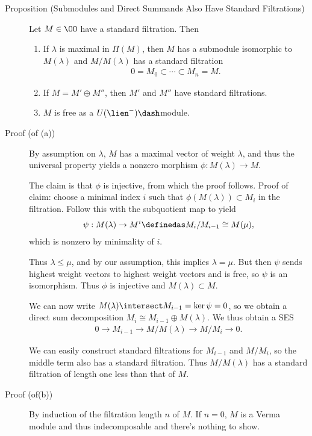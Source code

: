 \begin{description}
\item[Proposition (Submodules and Direct Summands Also Have Standard
Filtrations)]
Let \(M\in \OO\) have a standard filtration. Then

\begin{enumerate}
\def\labelenumi{\alph{enumi}.}
\tightlist
\item
  If \(\lambda\) is maximal in \(\Pi(M)\), then \(M\) has a submodule
  isomorphic to \(M(\lambda)\) and \(M/M(\lambda)\) has a standard
  filtration
  \begin{align*}0 = M_0 \subset \cdots \subset M_n = M.\end{align*}
\item
  If \(M = M' \oplus M''\), then \(M'\) and \(M''\) have standard
  filtrations.
\item
  \(M\) is free as a \(U(\lien^-)\dash\)module.
\end{enumerate}
\item[Proof (of (a))]
By assumption on \(\lambda\), \(M\) has a maximal vector of weight
\(\lambda\), and thus the universal property yields a nonzero morphism
\(\phi: M(\lambda) \to M\).

The claim is that \(\phi\) is injective, from which the proof follows.
Proof of claim: choose a minimal index \(i\) such that
\(\phi(M(\lambda)) \subset M_i\) in the filtration. Follow this with the
subquotient map to yield
\begin{align*}\psi: M(\lambda) \to M^i \definedas M_i/M_{i-1} \cong M(\mu),\end{align*}
which is nonzero by minimality of \(i\).

Thus \(\lambda \leq \mu\), and by our assumption, this implies
\(\lambda = \mu\). But then \(\psi\) sends highest weight vectors to
highest weight vectors and is free, so \(\psi\) is an isomorphism. Thus
\(\phi\) is injective and \(M(\lambda) \subset M\).

We can now write \(M(\lambda) \intersect M_{i-1} = \ker \psi = 0\), so
we obtain a direct sum decomposition
\(M_i \cong M_{i-1} \oplus M(\lambda)\). We thus obtain a SES
\begin{align*}0 \to M_{i-1} \to M/M(\lambda) \to M/M_i \to 0.\end{align*}

We can easily construct standard filtrations for \(M_{i-1}\) and
\(M/M_i\), so the middle term also has a standard filtration. Thus
\(M/M(\lambda)\) has a standard filtration of length one less than that
of \(M\).
\item[Proof (of(b))]
By induction of the filtration length \(n\) of \(M\). If \(n=0\), \(M\)
is a Verma module and thus indecomposable and there's nothing to show.


\end{description}
